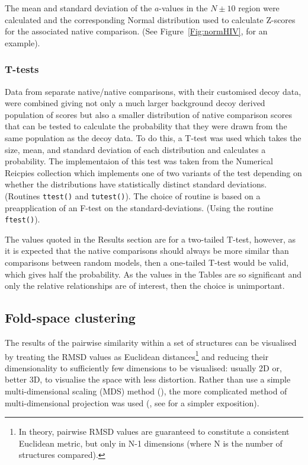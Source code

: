 \documentclass[preprint,12pt]{elsarticle}
\newcommand{\Fig}[1]{Figure~\ref{Fig:#1}}
\begin{document}
The mean and standard deviation of the $a$-values in the $N\pm10$ region were calculated
and the corresponding Normal distribution used to calculate Z-scores for the associated
native comparison. (See \Fig{normHIV}, for an example).

\subsubsection{T-tests}

Data from separate native/native comparisons, with their customised decoy data, were combined
giving not only a much larger background decoy derived population of scores but also a smaller
distribution of native comparison scores that can be tested to calculate the probability that
they were drawn from the same population as the decoy data.  To do this, a T-test was used which
takes the size, mean, and standard deviation of each distribution and calculates a probability.
The implementaion of this test was taken from the Numerical Reicpies collection \cite{PressWHet86}
which implements one of two variants of the test depending on whether the distributions
have statistically distinct standard deviations. (Routines {\tt ttest()} and {\tt tutest()}).
The choice of routine is based on a preapplication of an F-test on the standard-deviations.
(Using the routine {\tt ftest()}).

The values quoted in the Results section are for a two-tailed T-test, however, as it is expected
that the native comparisons should always be more similar than comparisons between random models,
then a one-tailed T-test would be valid, which gives half the probability.   As the values
in the Tables are so significant and only the relative relationships are of interest,
then the choice is unimportant.

\subsection{Fold-space clustering}

The results of the pairwise similarity within a set of structures can be visualised by treating the
RMSD values as Euclidean distances\footnote{In theory, pairwise RMSD values are guaranteed to constitute
a consistent Euclidean metric, but only in N-1 dimensions (where N is the number of structures compared).
} and reducing their dimensionality to sufficiently few dimensions to be visualised: usually 2D or,
better 3D, to visualise the space with less distortion.
Rather than use a simple multi-dimensional scaling (MDS) method (\cite{BrownNPet96}), the more complicated
method of multi-dimensional projection was used (\cite{AszodiAet97a}, see \cite{TaylorWRet01b} for a
simpler exposition).
\end{document}
